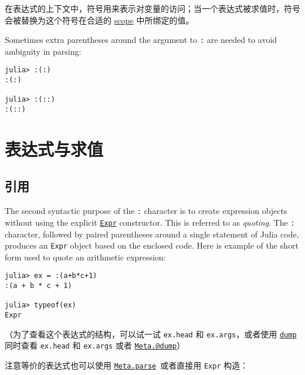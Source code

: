 在表达式的上下文中，符号用来表示对变量的访问；当一个表达式被求值时，符号会被替换为这个符号在合适的 \hyperlink{11957539949537805757}{scope} 中所绑定的值。



Sometimes extra parentheses around the argument to \texttt{:} are needed to avoid ambiguity in parsing:




\begin{verbatim}
julia> :(:)
:(:)

julia> :(::)
:(::)
\end{verbatim}



\hypertarget{3051242913122022314}{}


\section{表达式与求值}



\hypertarget{12430289445905702597}{}


\subsection{引用}



The second syntactic purpose of the \texttt{:} character is to create expression objects without using the explicit \hyperlink{17120496304147995299}{\texttt{Expr}} constructor. This is referred to as \emph{quoting}. The \texttt{:} character, followed by paired parentheses around a single statement of Julia code, produces an \texttt{Expr} object based on the enclosed code. Here is example of the short form used to quote an arithmetic expression:




\begin{verbatim}
julia> ex = :(a+b*c+1)
:(a + b * c + 1)

julia> typeof(ex)
Expr
\end{verbatim}



（为了查看这个表达式的结构，可以试一试 \texttt{ex.head} 和 \texttt{ex.args}，或者使用 \hyperlink{15981569052160951906}{\texttt{dump}} 同时查看 \texttt{ex.head} 和 \texttt{ex.args} 或者 \hyperlink{11314997131411442967}{\texttt{Meta.@dump}}）



注意等价的表达式也可以使用 \hyperlink{10422957797582368651}{\texttt{Meta.parse}} 或者直接用 \texttt{Expr} 构造：




